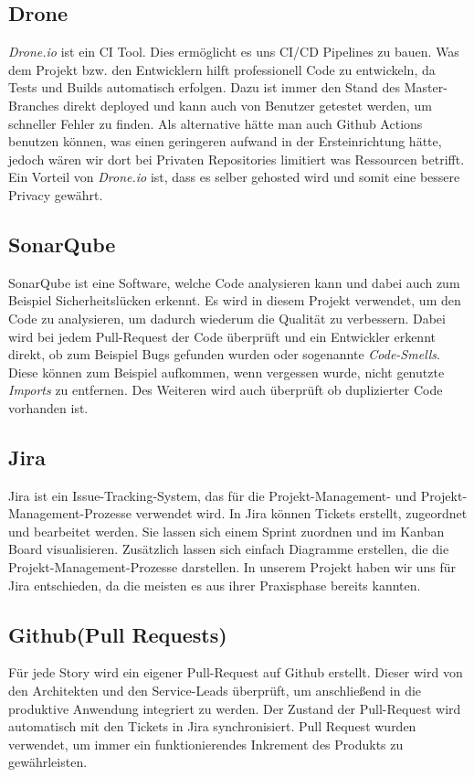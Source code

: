 \subsection{Drone}
    \textit{Drone.io} ist ein \ac{CI} Tool. Dies ermöglicht es uns \ac{CI/CD} Pipelines zu bauen. Was dem Projekt bzw. den Entwicklern hilft professionell Code zu entwickeln, da Tests und Builds automatisch erfolgen.
    Dazu ist immer den Stand des Master-Branches direkt deployed und kann auch von Benutzer getestet werden, um schneller Fehler zu finden. Als alternative hätte man auch Github Actions benutzen können, was einen geringeren
    aufwand in der Ersteinrichtung hätte, jedoch wären wir dort bei Privaten Repositories limitiert was Ressourcen betrifft. Ein Vorteil von \textit{Drone.io} ist, dass es selber gehosted wird und somit eine bessere Privacy gewährt.
\subsection{SonarQube}
    SonarQube ist eine Software, welche Code analysieren kann und dabei auch zum Beispiel Sicherheitslücken erkennt.
    Es wird in diesem Projekt verwendet, um den Code zu analysieren, um dadurch wiederum die Qualität zu verbessern.
    Dabei wird bei jedem Pull-Request der Code überprüft und ein Entwickler erkennt direkt, ob zum Beispiel Bugs gefunden wurden oder sogenannte \textit{Code-Smells}. 
    Diese können zum Beispiel aufkommen, wenn vergessen wurde, nicht genutzte \textit{Imports} zu entfernen.
    Des Weiteren wird auch überprüft ob duplizierter Code vorhanden ist.
\subsection{Jira}
    Jira ist ein Issue-Tracking-System, das für die Projekt-Management- und Projekt-Management-Prozesse verwendet wird.
    In Jira können Tickets erstellt, zugeordnet und bearbeitet werden. Sie lassen sich einem Sprint zuordnen und im Kanban Board visualisieren.
    Zusätzlich lassen sich einfach Diagramme erstellen, die die Projekt-Management-Prozesse darstellen.
    In unserem Projekt haben wir uns für Jira entschieden, da die meisten es aus ihrer Praxisphase bereits kannten.
\subsection{Github(Pull Requests)}
    Für jede Story wird ein eigener Pull-Request auf Github erstellt. Dieser wird von den Architekten und den Service-Leads überprüft, um anschließend in die
    produktive Anwendung integriert zu werden. Der Zustand der Pull-Request wird automatisch mit den Tickets in Jira synchronisiert.
    Pull Request wurden verwendet, um immer ein funktionierendes Inkrement des Produkts zu gewährleisten.
